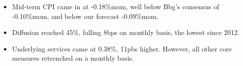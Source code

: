 \begin{itemize}
\tightlist
\item
  Mid-term CPI came in at -0.18\%mom, well below Bbg's consensus of
  -0.10\%mom, and below our forecast -0.09\%mom.
\item
  Diffusion reached 45\%, falling 8bps on monthly basis, the lowest
  since 2012.
\item
  Underlying services came at 0.38\%, 11pbs higher. However, all other
  core measures retrenched on a monthly basis.
\end{itemize}
